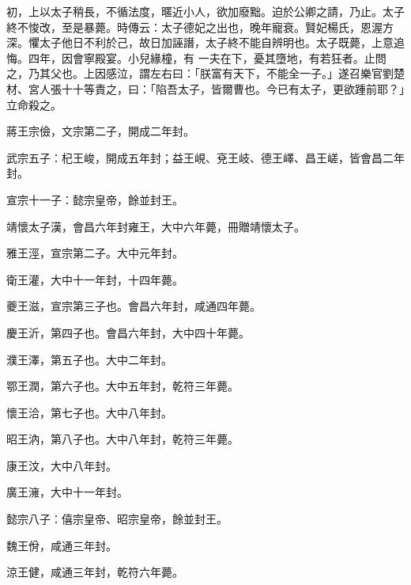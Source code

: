 \begin{pinyinscope}
 初，上以太子稍長，不循法度，暱近小人，欲加廢黜。迫於公卿之請，乃止。太子終不悛改，至是暴薨。時傳云：太子德妃之出也，晚年寵衰。賢妃楊氏，恩渥方深。懼太子他日不利於己，故日加誣譖，太子終不能自辨明也。太子既薨，上意追悔。四年，因會寧殿宴。小兒緣橦，有
 一夫在下，憂其墮地，有若狂者。止問之，乃其父也。上因感泣，謂左右曰：「朕富有天下，不能全一子。」遂召樂官劉楚材、宮人張十十等責之，曰：「陷吾太子，皆爾曹也。今已有太子，更欲踵前耶？」立命殺之。



 蔣王宗儉，文宗第二子，開成二年封。



 武宗五子：杞王峻，開成五年封；益王峴、兗王岐、德王嶧、昌王嵯，皆會昌二年封。



 宣宗十一子：懿宗皇帝，餘並封王。



 靖懷太子漢，會昌六年封雍王，大中六年薨，冊贈靖懷太子。



 雅王涇，宣宗第二子。大中元年封。



 衛王灌，大中十一年封，十四年薨。



 夔王滋，宣宗第三子也。會昌六年封，咸通四年薨。



 慶王沂，第四子也。會昌六年封，大中四十年薨。



 濮王澤，第五子也。大中二年封。



 鄂王潤，第六子也。大中五年封，乾符三年薨。



 懷王洽，第七子也。大中八年封。



 昭王汭，第八子也。大中八年封，乾符三年薨。



 康王汶，大中八年封。



 廣王澭，大中十一年封。



 懿宗八子：僖宗皇帝、昭宗皇帝，餘並封王。



 魏王佾，咸通三年封。



 涼王健，咸通三年封，乾符六年薨。




\end{pinyinscope}
